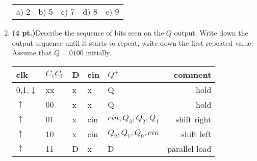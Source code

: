 \documentclass{article}
\begin{document}
\begin{enumerate}
\begin{tabular}{p{0.6in} p{0.6in} p{0.6in} p{0.6in} l}
a) 2  & b) 5  & c) 7 & d) 8  & e) 9
\end{tabular}

\pagebreak
\item {\bf (4 pt.)}Describe the sequence of bits seen on the
$Q$ output.  Write down the output sequence until it starts to
repeat, write down the first repeated value.  Assume that 
$Q=0100$ initially.

\begin{tabular}{l|l|l|l||l|r}
clk         & $C_1 C_0$ & D & cin & $Q^+$ & comment \\ \hline \hline
0,1,$\downarrow$ & xx   & x & x   & Q     & hold     \\ \hline
$\uparrow$     & 00     & x & x   & Q     & hold     \\  \hline
$\uparrow$     & 01     & x & cin & $cin,Q_3,Q_2,Q_1$  & shift right \\  \hline
$\uparrow$     & 10     & x & cin & $Q_2,Q_1,Q_0,cin$  & shift left \\  \hline
$\uparrow$     & 11     & D & x   & D     & parallel load  \\
\end{tabular}


\end{enumerate}
\end{document}

